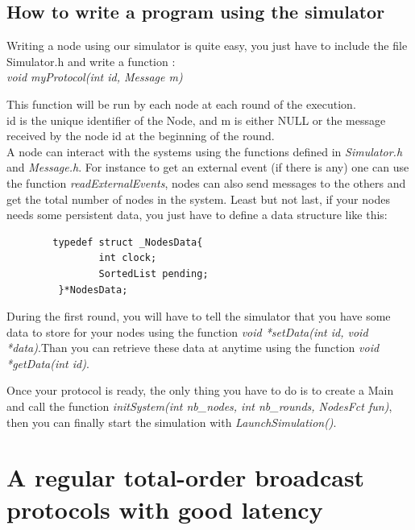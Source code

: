 \documentclass[a4paper]{article}
\begin{document}
        \subsection{How to write a program using the simulator}
        Writing a node using our simulator is quite easy, you just have to 
        include the file Simulator.h and write a function :\\
        \textit{void myProtocol(int id, Message m)}

        This function will be run by each node at each round of the execution.\\
        id is the unique identifier of the Node, and m is either NULL or the
        message received by the node id at the beginning of the round.\\
        A node can interact with the systems using the functions defined in
        \textit{Simulator.h} and \textit{Message.h}. For instance to get an external event
        (if there is any) one can use the function \textit{readExternalEvents},
        nodes can also send messages to the others and get the total number of
        nodes in the system. Least but not last, if your nodes needs some
        persistent data, you just have to define a data structure like this:\\
        \begin{verbatim}
        typedef struct _NodesData{
                int clock;
                SortedList pending;
         }*NodesData;
        \end{verbatim}
        During the first round, you will have to tell the simulator that you
        have some data to store for your nodes using the function \textit{void *setData(int id,
        void *data)}.Than you can retrieve these data at anytime using the function
        \textit{void *getData(int id)}.

        Once your protocol is ready, the only thing you have to do is to create
        a Main and call the function \textit{initSystem(int nb\_nodes, int
        nb\_rounds, NodesFct fun)}, then you can finally start the simulation
        with \textit{LaunchSimulation()}. 

        \section{A regular total-order broadcast protocols with good latency}
        \label{sec:latencyTO}
\end{document}
